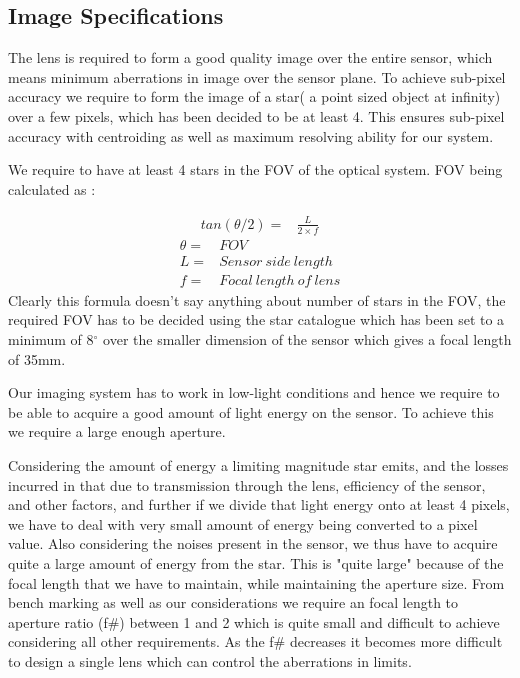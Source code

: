 \subsection{Image Specifications}
The lens is required to form a good quality image over the entire sensor, which means minimum aberrations in image over the sensor plane. To achieve sub-pixel accuracy we require to form the image of a star( a point sized object at infinity) over a few pixels, which has been decided to be at least 4. This ensures sub-pixel accuracy with centroiding as well as maximum resolving ability for our system.

We require to have at least 4 stars in the FOV of the optical system. FOV being calculated as :

\begin{align}
    tan(\theta/2)=&\frac{L}{2\times f}
\end{align}
\begin{align*}
    \theta=&FOV
    \\L=&Sensor\:side\:length
    \\f=&Focal\:length\:of\:lens 
\end{align*}
Clearly this formula doesn't say anything about number of stars in the FOV, the required FOV has to be decided using the star catalogue which has been set to a minimum of 8$^{\circ}$ over the smaller dimension of the sensor which gives a focal length of 35mm.

Our imaging system has to work in low-light conditions and hence we require to be able to acquire a good amount of light energy on the sensor. To achieve this we require a large enough aperture.

Considering the amount of energy a limiting magnitude star emits, and the losses incurred in that due to transmission through the lens, efficiency of the sensor, and other factors, and further if we divide that light energy onto at least 4 pixels, we have to deal with very small amount of energy being converted to a pixel value. Also considering the noises present in the sensor, we thus have to acquire quite a large amount of energy from the star.
This is "quite large" because of the focal length that we have to maintain, while maintaining the aperture size. From bench marking as well as our considerations we require an focal length to aperture ratio (f#) between 1 and 2 which is quite small and difficult to achieve considering all other requirements. As the f# decreases it becomes more difficult to design a single lens which can control the aberrations in limits.


